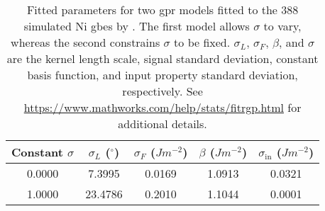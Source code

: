\begin{table}
\centering
\caption{Fitted parameters for two \gls{gpr} models fitted to the 388 simulated Ni \glspl{gbe} by \citet{olmstedSurveyComputedGrain2009a}. The first model allows $\sigma$ to vary, whereas the second constrains $\sigma$ to be fixed. $\sigma_L$, $\sigma_F$, $\beta$, and $\sigma$ are the kernel length scale, signal standard deviation, constant basis function, and input property standard deviation, respectively. See \url{https://www.mathworks.com/help/stats/fitrgp.html} for additional details.}
\label{table:resubloss-ni-pars}
\begin{tabular}{ccccc}
\toprule
Constant $\sigma$ & $\sigma_L$ ($^\circ{}$) & $\sigma_F$ ($J m^{-2}$) & $\beta$ ($J m^{-2}$) & $\sigma_\mathrm{in}$ ($J m^{-2}$) \\
\midrule
0.0000 & 7.3995 & 0.0169 & 1.0913 & 0.0321 \\
1.0000 & 23.4786 & 0.2010 & 1.1044 & 0.0001 \\
\bottomrule
\end{tabular}
\end{table}